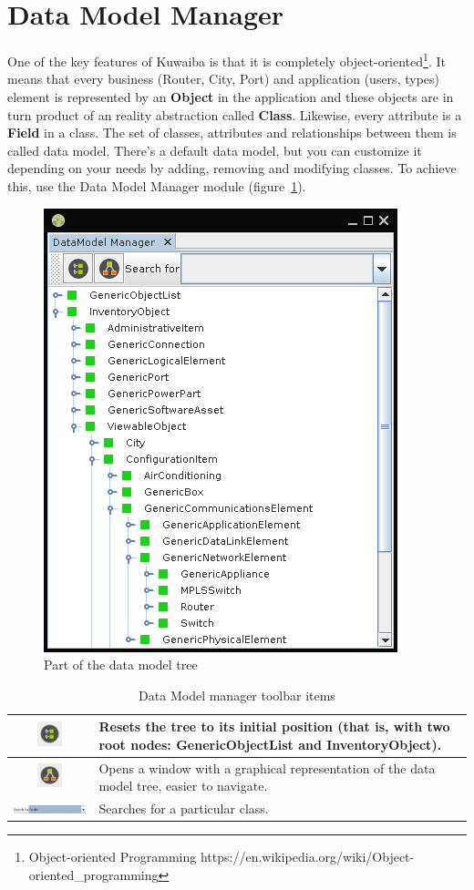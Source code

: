 \documentclass[a4paper]{article}
\begin{document}
	\section{Data Model Manager} \label{sec:data_model_manager}
		One of the key features of Kuwaiba is that it is completely object-oriented\footnote{Object-oriented Programming https://en.wikipedia.org/wiki/Object-oriented\_programming}. It means that every business (Router, City, Port) and application (users, types) element is represented by an \textbf{Object} in the application and these objects are in turn product of an reality abstraction called \textbf{Class}. Likewise, every attribute is a \textbf{Field} in a class. The set of classes, attributes and relationships between them is called data model. There's a default data model, but you can customize it depending on your needs by adding, removing and modifying classes. To achieve this, use the Data Model Manager module (figure~\ref{fig:data_model_manager}).
		\begin{figure}[h!]
			\centering
			\includegraphics[width=0.4\linewidth]{img/data_model_manager.png}
			\caption{Part of the data model tree}
			\label{fig:data_model_manager}
		\end{figure}
		\begin{table}[h!]
			\centering
			\begin{tabular}{cp{10cm}}
				\includegraphics[width=0.7cm]{img/icon_data_model_default_layout.png} & Resets the tree to its initial position (that is, with two root nodes: \textbf{GenericObjectList} and \textbf{InventoryObject}).\\
				\midrule
				\includegraphics[width=0.7cm]{img/icon_data_model_class_hierarchy_view.png} & Opens a window with a graphical representation of the data model tree,  easier to navigate.\\
				\midrule
				\includegraphics[width=5cm]{img/data_model_manager_search.png} & Searches for a particular class.\\
			\end{tabular}
			\caption{Data Model manager toolbar items}
			\label{tab:data_model_manager_toolbar_icons}
		\end{table}
\end{document}
